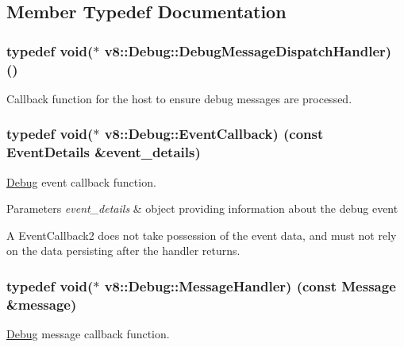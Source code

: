 \subsection{Member Typedef Documentation}
\hypertarget{classv8_1_1_debug_a91cd8aa9743e3478bc63fe73abcd557c}{}
\subsubsection[{Debug\+Message\+Dispatch\+Handler}]{\setlength{\rightskip}{0pt plus 5cm}typedef void($\ast$ v8\+::\+Debug\+::\+Debug\+Message\+Dispatch\+Handler) ()}\label{classv8_1_1_debug_a91cd8aa9743e3478bc63fe73abcd557c}
Callback function for the host to ensure debug messages are processed. \hypertarget{classv8_1_1_debug_ab53894746a21222796062f0e81ea28d8}{}
\subsubsection[{Event\+Callback}]{\setlength{\rightskip}{0pt plus 5cm}typedef void($\ast$ v8\+::\+Debug\+::\+Event\+Callback) (const {\bf Event\+Details} \&event\+\_\+details)}\label{classv8_1_1_debug_ab53894746a21222796062f0e81ea28d8}
\hyperlink{classv8_1_1_debug}{Debug} event callback function.


\begin{DoxyParams}{Parameters}
{\em event\+\_\+details} & object providing information about the debug event\\
\hline
\end{DoxyParams}
A Event\+Callback2 does not take possession of the event data, and must not rely on the data persisting after the handler returns. \hypertarget{classv8_1_1_debug_a526826b857bd3e3efa184e12bcebc694}{}
\subsubsection[{Message\+Handler}]{\setlength{\rightskip}{0pt plus 5cm}typedef void($\ast$ v8\+::\+Debug\+::\+Message\+Handler) (const {\bf Message} \&message)}\label{classv8_1_1_debug_a526826b857bd3e3efa184e12bcebc694}
\hyperlink{classv8_1_1_debug}{Debug} message callback function.


